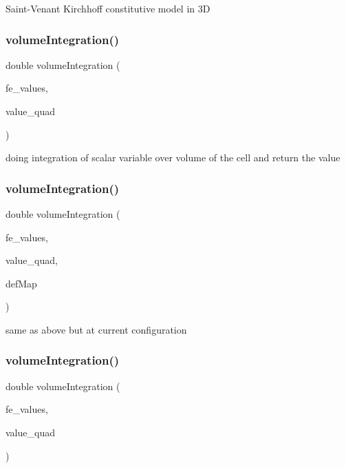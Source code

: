 Saint-\/\+Venant Kirchhoff constitutive model in 3D \mbox{\label{class_residual_a8ac0b75533aa9e599cc3c623e57fa5aa}} 
\subsubsection{\texorpdfstring{volume\+Integration()}{volumeIntegration()}\hspace{0.1cm}{\footnotesize\ttfamily [1/6]}}
{\footnotesize\ttfamily double volume\+Integration (\begin{DoxyParamCaption}\item[{const F\+E\+Values$<$ dim $>$ \&}]{fe\+\_\+values,  }\item[{double}]{value\+\_\+quad }\end{DoxyParamCaption})}

doing integration of scalar variable over volume of the cell and return the value \mbox{\label{class_residual_ad535764375d2690424b1545898b8a168}} 
\subsubsection{\texorpdfstring{volume\+Integration()}{volumeIntegration()}\hspace{0.1cm}{\footnotesize\ttfamily [2/6]}}
{\footnotesize\ttfamily double volume\+Integration (\begin{DoxyParamCaption}\item[{const F\+E\+Values$<$ dim $>$ \&}]{fe\+\_\+values,  }\item[{double}]{value\+\_\+quad,  }\item[{\mbox{\hyperlink{structdeformation_map}{deformation\+Map}}$<$ T, dim $>$ \&}]{def\+Map }\end{DoxyParamCaption})}

same as above but at current configuration \mbox{\label{class_residual_ab9fdc6a8b102af5beaa1e4eb6fb7fa40}} 
\subsubsection{\texorpdfstring{volume\+Integration()}{volumeIntegration()}\hspace{0.1cm}{\footnotesize\ttfamily [3/6]}}
{\footnotesize\ttfamily double volume\+Integration (\begin{DoxyParamCaption}\item[{const F\+E\+Values$<$ dim $>$ \&}]{fe\+\_\+values,  }\item[{Table$<$ 1, Sacado\+::\+Fad\+::\+D\+Fad$<$ double $>$ $>$ \&}]{value\+\_\+quad }\end{DoxyParamCaption})}

